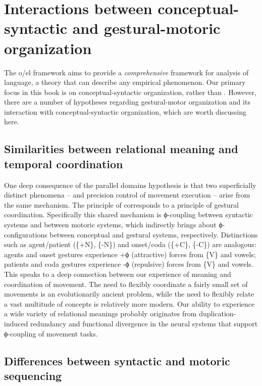 \section{Interactions between conceptual-syntactic and gestural-motoric organization}

The o/el framework aims to provide a \textit{comprehensive} framework for analysis of language, a theory that can describe any empirical phenomenon. Our primary focus in this book is on conceptual-syntactic organization, rather than . However, there are a number of hypotheses regarding gestural-motor organization and its interaction with conceptual-syntactic organization, which are worth discussing here.

\subsection{Similarities between relational meaning and temporal coordination}

One deep consequence of the parallel domains hypothesis is that two superficially distinct phenomena --  and precision control of movement execution -- arise from the same mechanism. The principle of  corresponds to a principle of gestural coordination. Specifically this shared mechanism is ϕ-coupling between syntactic systems and between motoric systems, which indirectly brings about ϕ-configurations between conceptual and gestural systems, respectively. Distinctions such as agent/patient (\{+N\}, \{-N\}) and onset/coda (\{+C\}, \{-C\}) are analogous: agents and onset gestures experience +ϕ (attractive) forces from \{V\} and vowels; patients and coda gestures experience -ϕ (repulsive) forces from \{V\} and vowels. This speaks to a deep connection between our experience of meaning and coordination of movement. The need to flexibly coordinate a fairly small set of movements is an evolutionarily ancient problem, while the need to flexibly relate a vast multitude of concepts is relatively more modern. Our ability to experience a wide variety of relational meanings probably originates from duplication-induced redundancy and functional divergence in the neural systems that support ϕ-coupling of movement tasks. 

\subsection{Differences between syntactic and motoric sequencing} 

